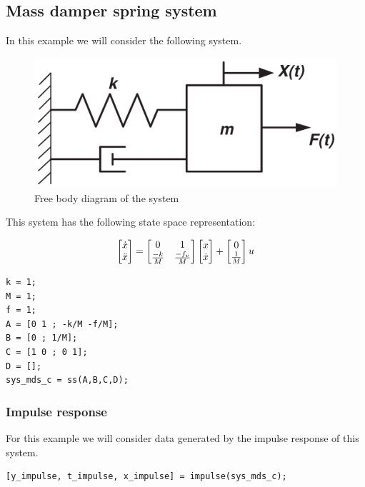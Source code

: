 \subsection{Mass damper spring system}

In this example we will consider the following system.

\begin{figure}[H]
	\centering
	\includegraphics[scale=0.15]{Latex/image/ex-msd/msd-system.png}
	\caption{Free body diagram of the system}
\end{figure}

This system has the following state space representation:

\[
	\begin{bmatrix}
		\dot{x} \cr \ddot{x}
	\end{bmatrix}
	= 
	\begin{bmatrix}
		0 & 1 \cr \frac{-k}{M} & \frac{-f_v}{M}
	\end{bmatrix}
	\begin{bmatrix}
		x \cr \dot{x}
	\end{bmatrix}
	+
	\begin{bmatrix}
		0 \cr \frac{1}{M}
	\end{bmatrix}
	u
\]
\begin{lstlisting}
k = 1;
M = 1;
f = 1;
A = [0 1 ; -k/M -f/M];
B = [0 ; 1/M];
C = [1 0 ; 0 1];
D = [];
sys_mds_c = ss(A,B,C,D);
\end{lstlisting}

\subsubsection{Impulse response}
For this example we will consider data generated by the impulse response of this system.

\begin{lstlisting}
[y_impulse, t_impulse, x_impulse] = impulse(sys_mds_c);
\end{lstlisting}

